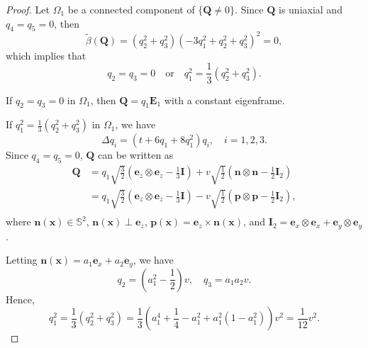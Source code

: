 \documentclass[10pt, a4paper]{article}
\newcommand\n{\mathbf{n}}
\newcommand\e{\mathbf{e}}
\newcommand\p{\mathbf{p}}
\newcommand\x{\mathbf{x}}
\newcommand\Qvec{\mathbf{Q}}
\newcommand\E{\mathbf{E}}
\begin{document}
\begin{proof}
Let $\Omega_1$ be a connected component of $\{ \Qvec \neq 0 \}$. Since $\Qvec$ is uniaxial and $q_4 =q_5 = 0$, then
\begin{equation}
\tilde{\beta}(\Qvec) = (q_2^2 + q_3^2)(- 3q_1^2 + q_2^2 + q_3^2)^2  = 0,
\end{equation}
which implies that
\begin{equation}
q_2 = q_3 = 0 \quad \text{or} \quad q_1^2 = \frac{1}{3}(q_2^2 + q_3^2).
\end{equation}

If $q_2 = q_3 = 0$ in $\Omega_1$, then $\Qvec = q_1 \E_1$ with a constant eigenframe. %

If $q_1^2 = \frac{1}{3}(q_2^2 + q_3^2)$ in $\Omega_1$, we have
\begin{equation}
\Delta q_i =  ( t + 6 q_1 + 8 q_1^2 ) q_i, \quad i = 1, 2, 3.  
\end{equation}
Since $q_4 = q_5 = 0$, $\Qvec$ can be written as
\begin{equation}\label{Q_2D}
\begin{aligned}
\Qvec & = q_1 \sqrt{\frac{3}{2}}(\mathbf{e}_z \otimes \mathbf{e}_z - \frac{1}{3} \mathbf{I}) + v \sqrt{\frac{1}{2}} (\n \otimes \n - \frac{1}{2} \mathbf{I}_2) \\
  & = q_1 \sqrt{\frac{3}{2}}(\mathbf{e}_z \otimes \mathbf{e}_z - \frac{1}{3} \mathbf{I}) - v \sqrt{\frac{1}{2}} (\p \otimes \p - \frac{1}{2} \mathbf{I}_2), \\
\end{aligned}
\end{equation}
where $\n(\x) \in \mathbb{S}^2$, $\n(\x) \perp \e_z$, $\p(\x) = \e_z \times \n(\x)$, and $\mathbf{I}_2 = \e_x \otimes \e_x + \e_y \otimes \e_y$.

Letting $\n(\x) = a_1 \mathbf{e}_x + a_2 \mathbf{e}_y$, we have
\begin{equation}
q_2 = (a_1^2  - \frac{1}{2}) v, \quad q_3 = a_1 a_2 v.
\end{equation}
Hence,
\begin{equation}
q_1^2 = \frac{1}{3}(q_2^2  + q_3^2) = \frac{1}{3}(a_1^4 + \frac{1}{4} - a_1^2 + a_1^2(1 - a_1^2) ) v^2 = \frac{1}{12} v^2.
\end{equation}


\end{proof}
\end{document}
